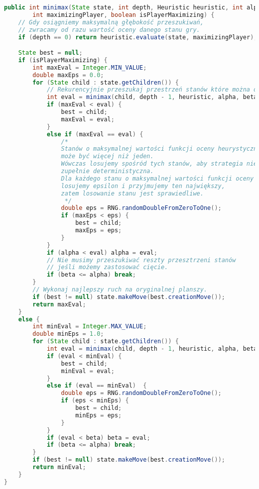 \begin{footnotesize}
\begin{lstlisting}[language=Java, frame=lines, numberstyle=\tiny, stepnumber=5, caption=Implementacja algorytmu Minimax, firstnumber=1]
public int minimax(State state, int depth, Heuristic heuristic, int alpha, int beta,
        int maximizingPlayer, boolean isPlayerMaximizing) {
    // Gdy osiągniemy maksymalną głębokość przeszukiwań, 
    // zwracamy od razu wartość oceny danego stanu gry.
    if (depth == 0) return heuristic.evaluate(state, maximizingPlayer);

    State best = null;
    if (isPlayerMaximizing) {
        int maxEval = Integer.MIN_VALUE;
        double maxEps = 0.0;
        for (State child : state.getChildren()) {
            // Rekurencyjnie przeszukaj przestrzeń stanów które można osiągnąć z obecnego stanu.
            int eval = minimax(child, depth - 1, heuristic, alpha, beta, maximizingPlayer, false);
            if (maxEval < eval) {
                best = child;
                maxEval = eval;
            }
            else if (maxEval == eval) {
                /*
                Stanów o maksymalnej wartości funkcji oceny heurystycznej
                może być więcej niż jeden.
                Wówczas losujemy spośród tych stanów, aby strategia nie była
                zupełnie deterministyczna.
                Dla każdego stanu o maksymalnej wartości funkcji oceny heurystycznej
                losujemy epsilon i przyjmujemy ten największy,
                zatem losowanie stanu jest sprawiedliwe.
                 */
                double eps = RNG.randomDoubleFromZeroToOne();
                if (maxEps < eps) {
                    best = child;
                    maxEps = eps;
                }
            }
            if (alpha < eval) alpha = eval;
            // Nie musimy przeszukiwać reszty przesztrzeni stanów
            // jeśli możemy zastosować cięcie.
            if (beta <= alpha) break;
        }
        // Wykonaj najlepszy ruch na oryginalnej planszy.
        if (best != null) state.makeMove(best.creationMove()); 
        return maxEval;
    }
    else {
        int minEval = Integer.MAX_VALUE;
        double minEps = 1.0;
        for (State child : state.getChildren()) {
            int eval = minimax(child, depth - 1, heuristic, alpha, beta, maximizingPlayer, true);
            if (eval < minEval) {
                best = child;
                minEval = eval;
            }
            else if (eval == minEval)  {
                double eps = RNG.randomDoubleFromZeroToOne();
                if (eps < minEps) {
                    best = child;
                    minEps = eps;
                }
            }
            if (eval < beta) beta = eval;
            if (beta <= alpha) break;
        }
        if (best != null) state.makeMove(best.creationMove());
        return minEval;
    }
}
\end{lstlisting} 
\end{footnotesize}
